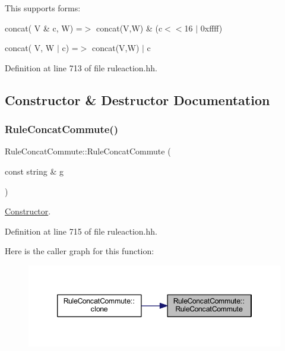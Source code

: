 This supports forms\+:
\begin{DoxyItemize}
\item {\ttfamily concat( V \& c, W) =$>$ concat(\+V,\+W) \& (c$<$$<$16 $\vert$ 0xffff)}
\item {\ttfamily concat( V, W $\vert$ c) =$>$ concat(\+V,\+W) $\vert$ c} 
\end{DoxyItemize}

Definition at line 713 of file ruleaction.\+hh.



\subsection{Constructor \& Destructor Documentation}
\mbox{\label{class_rule_concat_commute_a893eef10fd7ac5f9d49580159d2e67e3}} 
\subsubsection{\texorpdfstring{RuleConcatCommute()}{RuleConcatCommute()}}
{\footnotesize\ttfamily Rule\+Concat\+Commute\+::\+Rule\+Concat\+Commute (\begin{DoxyParamCaption}\item[{const string \&}]{g }\end{DoxyParamCaption})\hspace{0.3cm}{\ttfamily [inline]}}



\mbox{\hyperlink{class_constructor}{Constructor}}. 



Definition at line 715 of file ruleaction.\+hh.

Here is the caller graph for this function\+:
\nopagebreak
\begin{figure}[H]
\begin{center}
\leavevmode
\includegraphics[width=346pt]{class_rule_concat_commute_a893eef10fd7ac5f9d49580159d2e67e3_icgraph}
\end{center}
\end{figure}


